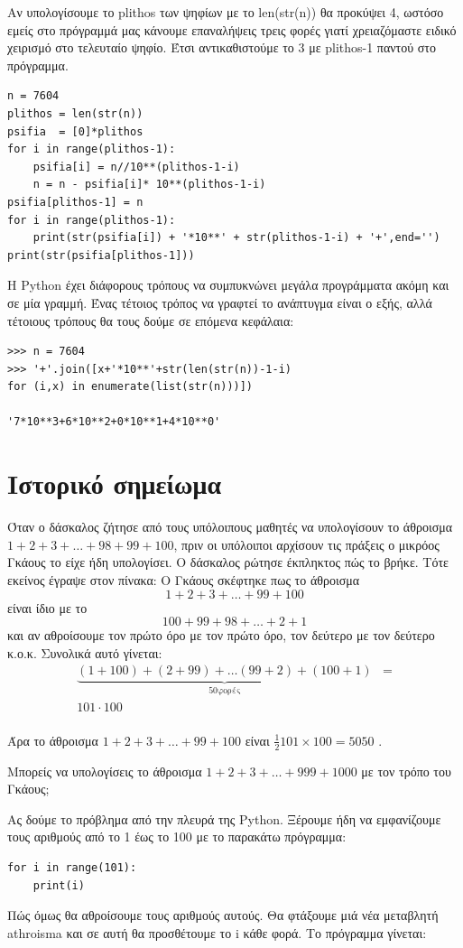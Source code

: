 \documentclass[b5paper,11pt,twoside,openleft]{memoir}
\begin{document}
Αν υπολογίσουμε το plithos των ψηφίων με το len(str(n)) θα προκύψει 4, ωστόσο εμείς στο πρόγραμμά μας κάνουμε επαναλήψεις τρεις φορές γιατί χρειαζόμαστε ειδικό χειρισμό στο τελευταίο ψηφίο. Έτσι αντικαθιστούμε το 3 με plithos-1 παντού στο πρόγραμμα.
\begin{lstlisting}
n = 7604
plithos = len(str(n))
psifia  = [0]*plithos
for i in range(plithos-1):
    psifia[i] = n//10**(plithos-1-i)
    n = n - psifia[i]* 10**(plithos-1-i)
psifia[plithos-1] = n
for i in range(plithos-1):
    print(str(psifia[i]) + '*10**' + str(plithos-1-i) + '+',end='')
print(str(psifia[plithos-1]))
\end{lstlisting}

Η Python έχει διάφορους τρόπους να συμπυκνώνει μεγάλα προγράμματα ακόμη και σε μία γραμμή. Ένας τέτοιος τρόπος να γραφτεί το ανάπτυγμα είναι ο εξής, αλλά τέτοιους τρόπους θα τους δούμε σε επόμενα κεφάλαια: 
\begin{lstlisting}
>>> n = 7604
>>> '+'.join([x+'*10**'+str(len(str(n))-1-i) 
for (i,x) in enumerate(list(str(n)))])

'7*10**3+6*10**2+0*10**1+4*10**0'
\end{lstlisting}

\section{Ιστορικό σημείωμα}

Όταν ο δάσκαλος ζήτησε από τους υπόλοιπους μαθητές να υπολογίσουν το άθροισμα $1+2+3+\ldots+98+99+100$, πριν οι υπόλοιποι αρχίσουν τις πράξεις ο μικρόος Γκάους το είχε ήδη υπολογίσει. Ο δάσκαλος ρώτησε έκπληκτος πώς το βρήκε. Τότε εκείνος έγραψε στον πίνακα:
O Γκάους σκέφτηκε πως το άθροισμα 
$$
1    +    2 + 3  + \ldots + 99 + 100
$$
είναι ίδιο με το
$$
100+  99+ 98+ \ldots +    2  + 1
$$
και αν αθροίσουμε τον πρώτο όρο με τον πρώτο όρο, τον δεύτερο με τον δεύτερο κ.ο.κ. Συνολικά αυτό γίνεται:
\begin{eqnarray}
\underbrace{(1+100) + (2+99) + \ldots  (99+2)+(100+1) }_{50 \text{φορές}} &=\\
101\cdot 100&\\
\end{eqnarray}

Άρα το άθροισμα $1 + 2 + 3+ \ldots + 99 + 100$ είναι $\frac{1}{2}101\times 100 = 5050$ .

Μπορείς να υπολογίσεις το άθροισμα $1 + 2 + 3+ \ldots + 999 + 1000$ με τον τρόπο του Γκάους;

Ας δούμε το πρόβλημα από την πλευρά της Python.
Ξέρουμε ήδη να εμφανίζουμε τους αριθμούς από το 1 έως το 100 με το παρακάτω πρόγραμμα:
\begin{lstlisting}
for i in range(101):
    print(i)
\end{lstlisting}
Πώς όμως θα αθροίσουμε τους αριθμούς αυτούς. Θα φτάξουμε μιά νέα μεταβλητή athroisma και σε αυτή θα προσθέτουμε το i κάθε φορά. Το πρόγραμμα γίνεται:
\end{document}
